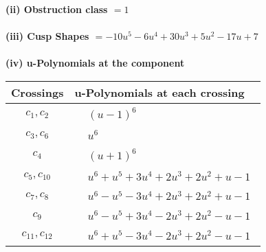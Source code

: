 \documentclass[1p]{elsarticle_modified}
\theoremstyle{definition}
\begin{document}
\flushleft \textbf{(ii) Obstruction class $= 1$}\\~\\
\flushleft \textbf{(iii) Cusp Shapes $= -10 u^5-6 u^4+30 u^3+5 u^2-17 u+7$}\\~\\
\newpage\renewcommand{\arraystretch}{1}
\flushleft \textbf{(iv) u-Polynomials at the component}\newline \\
\begin{tabular}{m{50pt}|m{274pt}}
Crossings & \hspace{64pt}u-Polynomials at each crossing \\
\hline $$\begin{aligned}c_{1},c_{2}\end{aligned}$$&$\begin{aligned}
&(u-1)^6
\end{aligned}$\\
\hline $$\begin{aligned}c_{3},c_{6}\end{aligned}$$&$\begin{aligned}
&u^6
\end{aligned}$\\
\hline $$\begin{aligned}c_{4}\end{aligned}$$&$\begin{aligned}
&(u+1)^6
\end{aligned}$\\
\hline $$\begin{aligned}c_{5},c_{10}\end{aligned}$$&$\begin{aligned}
&u^6+u^5+3 u^4+2 u^3+2 u^2+u-1
\end{aligned}$\\
\hline $$\begin{aligned}c_{7},c_{8}\end{aligned}$$&$\begin{aligned}
&u^6- u^5-3 u^4+2 u^3+2 u^2+u-1
\end{aligned}$\\
\hline $$\begin{aligned}c_{9}\end{aligned}$$&$\begin{aligned}
&u^6- u^5+3 u^4-2 u^3+2 u^2- u-1
\end{aligned}$\\
\hline $$\begin{aligned}c_{11},c_{12}\end{aligned}$$&$\begin{aligned}
&u^6+u^5-3 u^4-2 u^3+2 u^2- u-1
\end{aligned}$\\
\hline
\end{tabular}\\~\\
\end{document}
